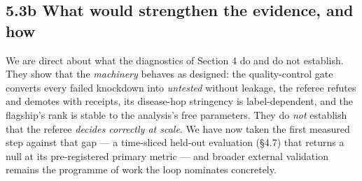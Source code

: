 \subsection*{5.3b What would strengthen the evidence, and how}\label{strengthening-the-evidence}

We are direct about what the diagnostics of Section 4 do and do not establish. They show that the
\emph{machinery} behaves as designed: the quality-control gate converts every failed knockdown into
\emph{untested} without leakage, the referee refutes and demotes with receipts, its disease-hop stringency is
label-dependent, and the flagship's rank is stable to the analysis's free parameters. They do \emph{not}
establish that the referee \emph{decides correctly at scale}. We have now taken the first measured step against
that gap --- a time-sliced held-out evaluation (\S{}4.7) that returns a null at its pre-registered primary
metric --- and broader external validation remains the programme of work the loop nominates concretely.

